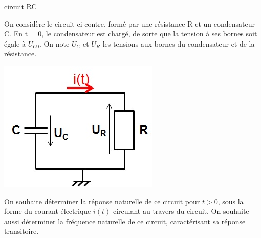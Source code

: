 \begin{remark}{}
        \begin{exemple}{circuit RC}
          \label{ex:circuit_rc}
          
          \begin{minipage}[l]{0.7\linewidth}
            On considère le circuit ci-contre, formé par une résistance
            R et un condensateur C. En t = 0, le condensateur est
            chargé, de sorte que la tension à ses bornes soit égale à
            $U_{C0}$. On note $U_{C}$ et $U_{R}$ les tensions aux bornes
            du condensateur et de la résistance.
          \end{minipage} \hfill
          \begin{minipage}[r]{0.4\linewidth}
            \includegraphics[scale=0.5]{images/circuit_RC_reponse_naturelle.jpg}
          \end{minipage}
          
          On souhaite déterminer la réponse naturelle de ce circuit pour
          $t > 0$, sous la forme du courant électrique $i(t)$ circulant au
          travers du circuit. On souhaite aussi déterminer la fréquence
          naturelle de ce circuit, caractérisant sa réponse transitoire.
          

\end{exemple}
\end{remark}
